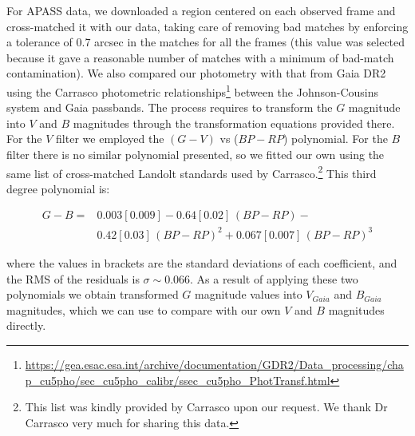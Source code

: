 \documentclass[draft]{aa}
\begin{document}
For APASS data, we downloaded a region centered on each
observed frame and cross-matched it with our data, taking care of removing
bad matches by enforcing a tolerance of 0.7 arcsec in the matches for all the
frames (this value was selected because it gave a reasonable number of
matches with a minimum of bad-match contamination).
%
We also compared our photometry with that from Gaia DR2 using the
Carrasco photometric
relationships\footnote{\url{https://gea.esac.esa.int/archive/documentation/GDR2/Data_processing/chap_cu5pho/sec_cu5pho_calibr/ssec_cu5pho_PhotTransf.html}}
between the Johnson-Cousins system and Gaia passbands. The process
requires to transform the $G$ magnitude into $V$ and $B$ magnitudes through the
transformation equations provided there. For the $V$ filter we employed the
$(G-V)$ vs ($BP-RP$) polynomial. For the $B$ filter there is no similar
polynomial presented, so we fitted our own using the same list of
cross-matched Landolt standards used by Carrasco.\footnote{This list was kindly
provided by Carrasco upon our request. We thank Dr Carrasco very much for
sharing this data.} This third degree polynomial is:

\begin{equation}
\begin{aligned}
G - B = {} & 0.003[0.009]-0.64[0.02]\,(BP-RP)- \\
        & 0.42[0.03]\,(BP-RP)^2+0.067[0.007]\,(BP-RP)^3
\end{aligned}
\end{equation}

\noindent
where the values in brackets are the standard deviations of each
coefficient, and the RMS of the residuals is $\sigma\sim0.066$.
As a result of applying these two polynomials we obtain transformed $G$
magnitude values into $V_{Gaia}$ and $B_{Gaia}$ magnitudes, which we can use to
compare with our own $V$ and $B$ magnitudes directly.
\end{document}

